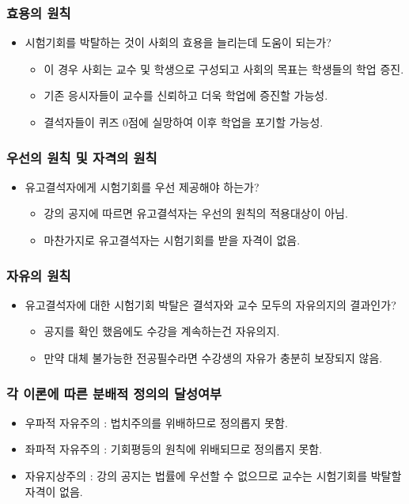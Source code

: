 \documentclass[aspectratio=169,xcolor=dvipsnames,]{beamer}
\begin{document}
\begin{frame}[<+->]
\frametitle{효용의 원칙}
    \begin{itemize}
        \item 시험기회를 박탈하는 것이 사회의 효용을 늘리는데 도움이 되는가?
        \begin{itemize}
            \item 이 경우 사회는 교수 및 학생으로 구성되고 사회의 목표는 학생들의 학업 증진.
            \item 기존 응시자들이 교수를 신뢰하고 더욱 학업에 증진할 가능성.
            \item 결석자들이 퀴즈 0점에 실망하여 이후 학업을 포기할 가능성. 
        \end{itemize}
    \end{itemize}
\end{frame}

\begin{frame}[<+->]
\frametitle{우선의 원칙 및 자격의 원칙}
    \begin{itemize}
        \item 유고결석자에게 시험기회를 우선 제공해야 하는가?
        \begin{itemize}
            \item 강의 공지에 따르면 유고결석자는 우선의 원칙의 적용대상이 아님.
            \item 마찬가지로 유고결석자는 시험기회를 받을 자격이 없음.
        \end{itemize}
    \end{itemize}
\end{frame}

\begin{frame}[<+->]
\frametitle{자유의 원칙 }
    \begin{itemize}
        \item 유고결석자에 대한 시험기회 박탈은 결석자와 교수 모두의 자유의지의 결과인가?
        \begin{itemize}
            \item 공지를 확인 했음에도 수강을 계속하는건 자유의지.
            \item 만약 대체 불가능한 전공필수라면 수강생의 자유가 충분히 보장되지 않음.
        \end{itemize}
    \end{itemize}
\end{frame}


\begin{frame}[<+->]
\frametitle{각 이론에 따른 분배적 정의의 달성여부}
    \begin{itemize}
        \item 우파적 자유주의 : 법치주의를 위배하므로 정의롭지 못함.
        \item 좌파적 자유주의 : 기회평등의 원칙에 위배되므로 정의롭지 못함.
        \item 자유지상주의 : 강의 공지는 법률에 우선할 수 없으므로 교수는 시험기회를 박탈할 자격이 없음.
    \end{itemize}
\end{frame}
\end{document}
